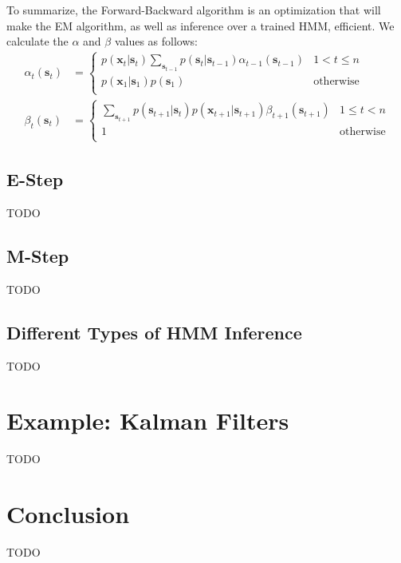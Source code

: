To summarize, the Forward-Backward algorithm is an optimization that will make the EM algorithm, as well as inference over a trained HMM, efficient. We calculate the $\alpha$ and $\beta$ values as follows:
\begin{align*}
	\alpha_t(\textbf{s}_t) &=
	\begin{cases} 
      p(\textbf{x}_t | \textbf{s}_t) \sum_{\textbf{s}_{t-1}} p(\textbf{s}_t | \textbf{s}_{t-1}) \alpha_{t-1}(\textbf{s}_{t-1}) & 1 < t \leq n \\
      p(\textbf{x}_1 | \textbf{s}_{1}) p(\textbf{s}_1) & \text{otherwise} \\
   \end{cases} \\
   \beta_t(\textbf{s}_t) &=
   \begin{cases} 
      \sum_{\textbf{s}_{t+1}} p(\textbf{s}_{t+1} | \textbf{s}_t) p(\textbf{x}_{t+1} | \textbf{s}_{t+1}) \beta_{t+1}(\textbf{s}_{t+1}) & 1 \leq t < n \\
      1 & \text{otherwise} \\
   \end{cases}
\end{align*}

\subsection{E-Step}
TODO

\subsection{M-Step}
TODO

\subsection{Different Types of HMM Inference}
TODO

\section{Example: Kalman Filters}
TODO

\section{Conclusion}
TODO